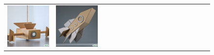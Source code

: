 \begin{figure}[ht!]
\begin{adjustwidth}{-0.8in}{-0.5in}
\begin{tabular}{cccccccccccccccccccc}
\multicolumn{2}{c}{\includegraphics[width=\threebythreecolwidth\textwidth]{figures/cherries/cardboard_spaceship_1.jpg}} &
\multicolumn{2}{c}{\includegraphics[width=\threebythreecolwidth\textwidth]{figures/cherries/cardboard_spaceship_2.jpg}} &&

\end{tabular}
\end{adjustwidth}
\end{figure}
